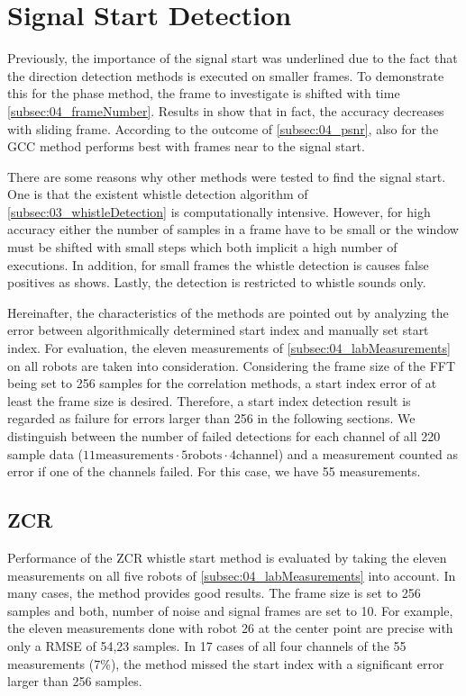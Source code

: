 \section{Signal Start Detection}
\label{sec:04_signalStartDetection}

Previously, the importance of the signal start was underlined
due to the fact that the direction detection methods is
executed on smaller frames.
To demonstrate this for the phase method, the frame to investigate is
shifted with time \cref{subsec:04_frameNumber}.
Results in show that in fact, the accuracy decreases with sliding frame.
According to the outcome of \cref{subsec:04_psnr}, also for the \ac{GCC}
method performs best with frames near to the signal start.

There are some reasons why other methods were tested to find the signal start.
One is that the existent whistle detection algorithm of \cref{subsec:03_whistleDetection}
is computationally intensive.
However, for high accuracy either the number of samples in a frame have to be
small or the window must be shifted with small steps which both implicit
a high number of executions.
In addition, for small frames the whistle detection is causes false positives
as \label{subsec:04_whistleDetection} shows.
Lastly, the detection is restricted to whistle sounds only.

Hereinafter, the characteristics of the methods are pointed out by
analyzing the error between algorithmically determined start index
and manually set start index.
For evaluation, the eleven measurements of \cref{subsec:04_labMeasurements}
on all robots are taken into consideration.
Considering the frame size of the \ac{FFT} being set to 256 samples for the
correlation methods, a start index error of at least the frame size is
desired.
Therefore, a start index detection result is regarded as failure for errors
larger than 256 in the following sections.
We distinguish between the number of failed detections for each channel of
all 220 sample data ($11 \text{measurements} \cdot 5 \text{robots} \cdot 4 \text{channel}$)
and a measurement counted as error if one of the channels failed.
For this case, we have 55 measurements.

\subsection{ZCR}
\label{subsec:04_zcr}

Performance of the \ac{ZCR} whistle start method is evaluated by taking the eleven
measurements on all five robots of \cref{subsec:04_labMeasurements} into account.
In many cases, the method provides good results.
The frame size is set to 256 samples and both, number of noise and signal frames
are set to 10.
For example, the eleven measurements done with robot 26 at the center point
are precise with only a \ac{RMSE} of 54,23 samples.
In 17 cases of all four channels of the 55 measurements (7\si{\percent}),
the method missed the start index with a significant error larger than 256 samples.

